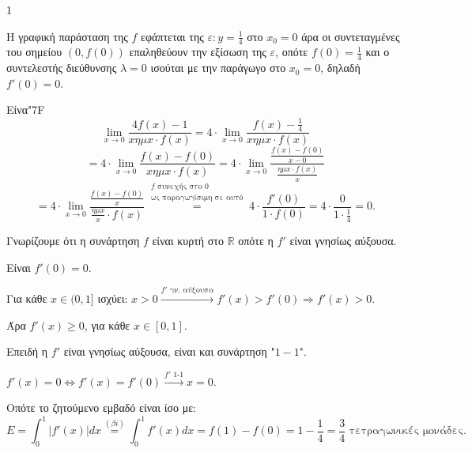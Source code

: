 \begin{ylh}{1}
    \item [Ύλη από εικόνα]
\end{ylh}
\begin{alist}
    \item [\textalpha)]
    \begin{rlist}
        \item Η γραφική παράσταση της $f$ εφάπτεται της $\varepsilon: y=\frac{1}{4}$ στο $x_0 = 0$ άρα οι συντεταγμένες του σημείου $(0,f(0))$ επαληθεύουν την εξίσωση της $\varepsilon$, οπότε $f(0)=\frac{1}{4}$ και ο συντελεστής διεύθυνσης $\lambda = 0$ ισούται με την παράγωγο στο $x_0 = 0$, δηλαδή $f'(0)=0$.
        \item Είνα\kern0pt\accent"7F
        \[ \lim_{x\to 0} \frac{4f(x)-1}{x \eta\mu x \cdot f(x)} = 4 \cdot \lim_{x\to 0} \frac{f(x)-\frac{1}{4}}{x \eta\mu x \cdot f(x)} \]
        \[ = 4 \cdot \lim_{x\to 0} \frac{f(x)-f(0)}{x \eta\mu x \cdot f(x)} = 4 \cdot \lim_{x\to 0} \frac{\frac{f(x)-f(0)}{x-0}}{\frac{\eta\mu x \cdot f(x)}{x}} \]
        \[ = 4 \cdot \lim_{x\to 0} \frac{\frac{f(x)-f(0)}{x}}{\frac{\eta\mu x}{x} \cdot f(x)} \stackrel{\substack{f \text{ συνεχής στο } 0 \\ \text{ως παραγωγίσιμη σε αυτό}}}{=} 4 \cdot \frac{f'(0)}{1 \cdot f(0)} = 4 \cdot \frac{0}{1 \cdot \frac{1}{4}} = 0. \]
    \end{rlist}

    \item [\textbeta)]
    \begin{rlist}
        \item Γνωρίζουμε ότι η συνάρτηση $f$ είναι κυρτή στο $\mathbb{R}$ οπότε η $f'$ είναι γνησίως αύξουσα.

        Είναι $f'(0)=0$.

        Για κάθε $x \in (0,1]$ ισχύει: $x>0 \xrightarrow{f' \text{ γν. αύξουσα}} f'(x)>f'(0) \Rightarrow f'(x)>0$.

        Άρα $f'(x) \ge 0$, για κάθε $x \in [0,1]$.
        \item Επειδή η $f'$ είναι γνησίως αύξουσα, είναι και συνάρτηση "$1-1$".

        $f'(x)=0 \Leftrightarrow f'(x)=f'(0) \xrightarrow{f' \text{ 1-1}} x=0$.

        Οπότε το ζητούμενο εμβαδό είναι ίσο με:
        \[ E = \int_{0}^{1} |f'(x)|dx \overset{(\beta i)}{=} \int_{0}^{1} f'(x)dx = f(1)-f(0)=1-\frac{1}{4}=\frac{3}{4} \text{ τετραγωνικές μονάδες}. \]
    \end{rlist}
\end{alist}